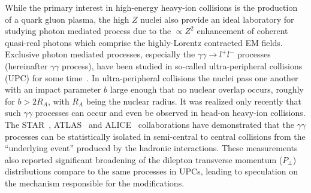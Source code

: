 \documentclass[12pt,epjc3]{svjour3}\sloppy
\begin{document}
While the primary interest in high-energy heavy-ion collisions is the production of a quark gluon plasma, the high $Z$ nuclei also provide an ideal laboratory for studying photon mediated process due to the $\propto Z^2$ enhancement of coherent quasi-real photons which comprise the highly-Lorentz contracted EM fields. 
Exclusive photon mediated processes, especially the $\gamma\gamma \rightarrow l^+l^-$ processes (hereinafter $\gamma\gamma$ process), have been studied in so-called ultra-peripheral collisions (UPC) for some time~\cite{abbasCharmoniumPairPhotoproduction2013a,bertulaniElectromagneticProcessesRelativistic1988,baurElectronPositronPairProduction2007a,starcollaborationProductionEnsuremathPairs2004}. In ultra-peripheral collisions the nuclei pass one another with an impact parameter $b$ large enough that no nuclear overlap occurs, roughly for $b>2R_A$, with $R_A$ being the nuclear radius. 
It was realized only recently that such $\gamma\gamma$ processes can occur and even be observed in head-on heavy-ion collisions. The STAR~\cite{starcollaborationLowEnsuremathPair2018b}, ATLAS~\cite{atlascollaborationObservationCentralityDependentAcoplanarity2018a} and ALICE~\cite{lehnerDielectronProductionLow2019a} collaborations have demonstrated that the $\gamma\gamma$ processes can be statistically isolated in semi-central to central collisions from the ``underlying event'' produced by the hadronic interactions. 
These measurements also reported significant broadening of the dilepton transverse momentum ($P_\perp$) distributions compare to the same processes in UPCs, leading to speculation on the mechanism responsible for the modifications. 
\end{document}
